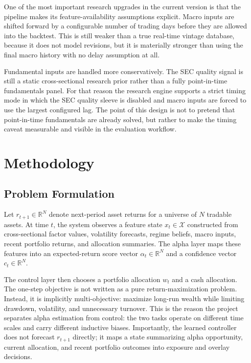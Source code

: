 \documentclass[10pt,twocolumn]{article}
\begin{document}
One of the most important research upgrades in the current version is that the
pipeline makes its feature-availability assumptions explicit. Macro inputs are
shifted forward by a configurable number of trading days before they are allowed
into the backtest. This is still weaker than a true real-time vintage database,
because it does not model revisions, but it is materially stronger than using
the final macro history with no delay assumption at all.

Fundamental inputs are handled more conservatively. The SEC quality signal is
still a static cross-sectional research prior rather than a fully point-in-time
fundamentals panel. For that reason the research engine supports a strict timing
mode in which the SEC quality sleeve is disabled and macro inputs are forced to
use the largest configured lag. The point of this design is not to pretend that
point-in-time fundamentals are already solved, but rather to make the timing
caveat measurable and visible in the evaluation workflow.

\section{Methodology}

\subsection{Problem Formulation}

Let $r_{t+1} \in \mathbb{R}^N$ denote next-period asset returns for a universe of
$N$ tradable assets. At time $t$, the system observes a feature state
$x_t \in \mathcal{X}$ constructed from cross-sectional factor values,
volatility forecasts, regime beliefs, macro inputs, recent portfolio returns,
and allocation summaries. The alpha layer maps these features into an
expected-return score vector $\alpha_t \in \mathbb{R}^N$ and a confidence
vector $c_t \in \mathbb{R}^N$.

The control layer then chooses a portfolio allocation $w_t$ and a cash
allocation. The one-step objective is not written as a pure return-maximization
problem. Instead, it is implicitly multi-objective: maximize long-run wealth
while limiting drawdown, volatility, and unnecessary turnover. This is the
reason the project separates alpha estimation from control: the two tasks
operate on different time scales and carry different inductive biases.
Importantly, the learned controller does not forecast $r_{t+1}$ directly; it
maps a state summarizing alpha opportunity, current allocation, and recent
portfolio outcomes into exposure and overlay decisions.
\end{document}
